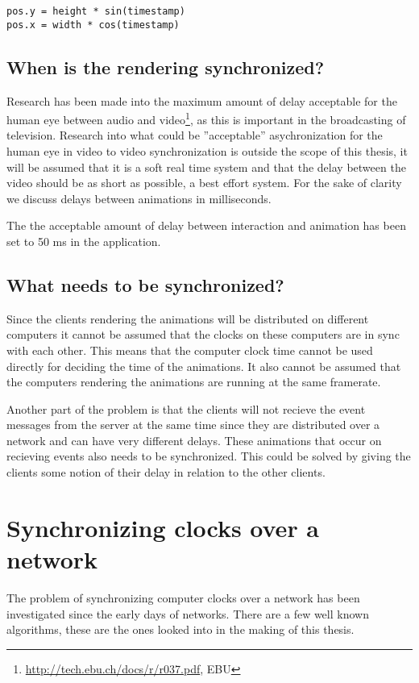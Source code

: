 \begin{verbatim}
pos.y = height * sin(timestamp)
pos.x = width * cos(timestamp)
\end{verbatim}

\subsection{When is the rendering synchronized?}

Research has been made into the maximum amount of delay acceptable for the human eye between audio and video\footnote{\url{http://tech.ebu.ch/docs/r/r037.pdf}, EBU}, as this is important in the broadcasting of television. Research into what could be ''acceptable'' asychronization for the human eye in video to video synchronization is outside the scope of this thesis, it will be assumed that it is a soft real time system and that the delay between the video should be as short as possible, a best effort system. For the sake of clarity we discuss delays between animations in milliseconds.

The the acceptable amount of delay between interaction and animation has been set to 50 ms in the application.  

\subsection{What needs to be synchronized?}

Since the clients rendering the animations will be distributed on different computers it cannot be assumed that the clocks on these computers are in sync with each other. This means that the computer clock time cannot be used directly for deciding the time of the animations. It also cannot be assumed that the computers rendering the animations are running at the same framerate. 

Another part of the problem is that the clients will not recieve the event messages from the server at the same time since they are distributed over a network and can have very different delays. These animations that occur on recieving events also needs to be synchronized. This could be solved by giving the clients some notion of their delay in relation to the other clients. 

\section{Synchronizing clocks over a network}
The problem of synchronizing computer clocks over a network has been investigated since the early days of networks. There are a few well known algorithms, these are the ones looked into in the making of this thesis. 





